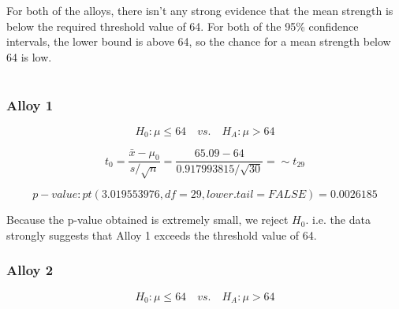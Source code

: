 \documentclass[letterpaper]{article}
\begin{document}
For both of the alloys, there isn't any strong evidence that the mean strength
is below the required threshold value of 64. For both of the 95\% confidence
intervals, the lower bound is above 64, so the chance for a mean strength below
64 is low.

\section{}%
\subsection{}%
%
\subsubsection*{Alloy 1}

$$H_0: \mu \leq 64 \quad vs. \quad H_A: \mu > 64 $$

$$t_0 = \frac{\bar{x}-\mu_0}{s/\sqrt{n}} = \frac{65.09 - 64}{0.917993815/\sqrt{30}} =   \sim t_{29}$$

$$ {p-value}: pt(3.019553976, df=29, lower.tail=FALSE) = 0.0026185 $$

Because the p-value obtained is extremely small, we reject $H_0$.
i.e. the data strongly suggests that Alloy 1 exceeds the threshold value of 64.

\subsubsection*{Alloy 2}

$$H_0: \mu \leq 64 \quad vs. \quad H_A: \mu > 64 $$
\end{document}
